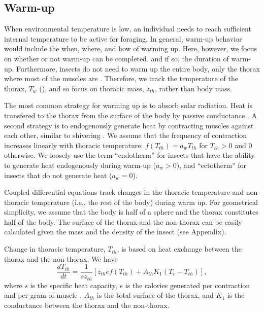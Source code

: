 \subsection*{Warm-up}

When environmental temperature is low, an individual needs to reach sufficient internal temperature to be active for foraging. %
In general, warm-up behavior would include the when, where, and how of warming up.
Here, however, we focus on whether or not warm-up can be completed, and if so, the duration of warm-up.
Furthermore, insects do not need to warm up the entire body, only the thorax where most of the muscles are \citep{Kammer1974, Heinrich1975, Bartholomew1978, Verdu2012}.
Therefore, we track the temperature of the thorax, $T_w$ (), and so focus on thoracic mass, $z_{th}$, rather than body mass.

The most common strategy for warming up is to absorb solar radiation.
Heat is transfered to the thorax from the surface of the body by passive conductance \citep{Bakken1976}.
A second strategy is to endogenously generate heat by contracting muscles against each other, similar to shivering \citep[e.g.,][]{Kammer1974}.
We assume that the frequency of contraction increases linearly with thoracic temperature: $f(T_{th}) = a_w T_{th}$ for $T_{th} > 0$ and 0 otherwise.
We loosely use the term ``endotherm'' for insects that have the ability to generate heat endogenously during warm-up ($a_w > 0$), and ``ectotherm'' for insects that do not generate heat ($a_w = 0$).

Coupled differential equations  track changes in the thoracic temperature and non-thoracic temperature (i.e., the rest of the body) during warm up.
For geometrical simplicity, we assume that the body is half of a sphere and the thorax constitutes half of the body.
The surface of the thorax and the non-thorax can be easily calculated given the mass and the density of the insect (see Appendix).

Change in thoracic temperature, $T_{th}$, is based on heat exchange between the thorax and the non-thorax.
We have
\begin{equation} \label{eq:dTh}
	\frac{dT_{th}}{dt} = \frac{1}{s z_{th}} \left[ z_{th} e f(T_{th}) +  A_{th} K_1(T_r - T_{th}) \right],
\end{equation}
where $s$ is the specific heat capacity, $e$ is the calories generated per contraction and per gram of muscle \citep{Kammer1974}, $A_{th}$ is the total surface of the thorax, and $K_1$ is the conductance between the thorax and the non-thorax.

